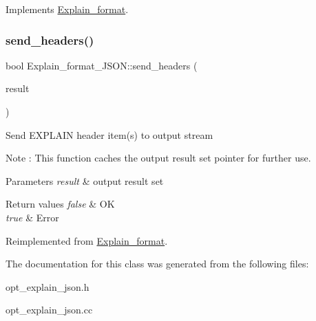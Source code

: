 Implements \mbox{\hyperlink{classExplain__format_a91ab0cd859549a7df55746df2491ca60}{Explain\+\_\+format}}.

\mbox{\label{classExplain__format__JSON_a66a631eb1439d85e5616b86bbbddc923}} 
\subsubsection{\texorpdfstring{send\+\_\+headers()}{send\_headers()}}
{\footnotesize\ttfamily bool Explain\+\_\+format\+\_\+\+J\+S\+O\+N\+::send\+\_\+headers (\begin{DoxyParamCaption}\item[{Query\+\_\+result $\ast$}]{result }\end{DoxyParamCaption})\hspace{0.3cm}{\ttfamily [virtual]}}

Send E\+X\+P\+L\+A\+IN header item(s) to output stream

\begin{DoxyNote}{Note}
\+: This function caches the output result set pointer for further use.
\end{DoxyNote}

\begin{DoxyParams}{Parameters}
{\em result} & output result set\\
\hline
\end{DoxyParams}

\begin{DoxyRetVals}{Return values}
{\em false} & OK \\
\hline
{\em true} & Error \\
\hline
\end{DoxyRetVals}


Reimplemented from \mbox{\hyperlink{classExplain__format_ae4808c82b9c88d94ede33477753917f3}{Explain\+\_\+format}}.



The documentation for this class was generated from the following files\+:\begin{DoxyCompactItemize}
\item 
opt\+\_\+explain\+\_\+json.\+h\item 
opt\+\_\+explain\+\_\+json.\+cc\end{DoxyCompactItemize}
